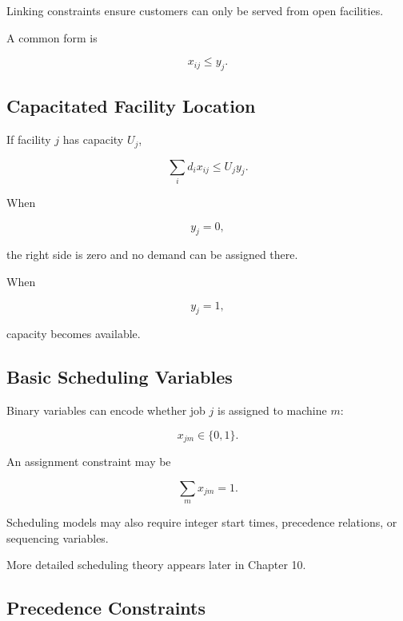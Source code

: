 Linking constraints ensure customers can only be served from open
facilities.

A common form is

\[
\boxed{
x_{ij}\leq y_j.
}
\]

\subsection{Capacitated Facility Location}
\label{subsec:capacitated-facility-location}

If facility \(j\) has capacity \(U_j\),

\[
\boxed{
\sum_i
d_i x_{ij}
\leq
U_j y_j.
}
\]

When

\[
y_j=0,
\]

the right side is zero and no demand can be assigned there.

When

\[
y_j=1,
\]

capacity becomes available.

\subsection{Basic Scheduling Variables}
\label{subsec:integer-scheduling-variables}

Binary variables can encode whether job \(j\) is assigned to machine
\(m\):

\[
\boxed{
x_{jm}
\in
\{0,1\}.
}
\]

An assignment constraint may be

\[
\boxed{
\sum_m
x_{jm}
=
1.
}
\]

Scheduling models may also require integer start times, precedence
relations, or sequencing variables.

More detailed scheduling theory appears later in Chapter 10.

\subsection{Precedence Constraints}
\label{subsec:integer-precedence-constraints}

